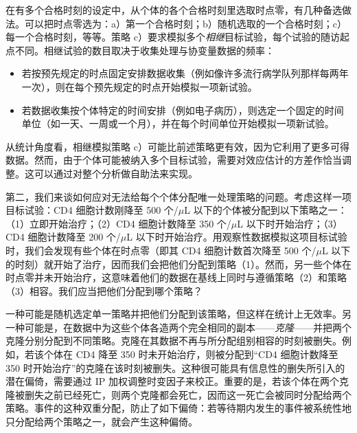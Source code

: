 在有多个合格时刻的设定中，从个体的各个合格时刻里选取时点零，有几种备选做法。可以把时点零选为：a）第一个合格时刻；b）随机选取的一个合格时刻；c）每一个合格时刻，等等。策略 c）要求模拟多个\emph{相继}目标试验，每个试验的随访起点不同。相继试验的数目取决于收集处理与协变量数据的频率：

\begin{itemize}
\item 若按预先规定的时点固定安排数据收集（例如像许多流行病学队列那样每两年一次），则在每个预先规定的时点开始模拟一项新试验。
\item 若数据收集按个体特定的时间安排（例如电子病历），则选定一个固定的时间单位（如一天、一周或一个月），并在每个时间单位开始模拟一项新试验。
\end{itemize}

从统计角度看，相继模拟策略 c）可能比前述策略更有效，因为它利用了更多可得数据。然而，由于个体可能被纳入多个目标试验，需要对效应估计的方差作恰当调整。这可以通过对整个分析做自助法来实现。

第二，我们来谈如何应对无法给每个个体分配唯一处理策略的问题。考虑这样一项目标试验：CD4 细胞计数刚降至 500 个/$\mu$L 以下的个体被分配到以下策略之一：（1）立即开始治疗；（2）CD4 细胞计数降至 350 个/$\mu$L 以下时开始治疗；（3）CD4 细胞计数降至 200 个/$\mu$L 以下时开始治疗。用观察性数据模拟这项目标试验时，我们会发现有些个体在时点零（即其 CD4 细胞计数首次降至 500 个/$\mu$L 以下的时刻）就开始了治疗，因而我们会把他们分配到策略（1）。然而，另一些个体在时点零并未开始治疗，这意味着他们的数据在基线上同时与遵循策略（2）和策略（3）相容。我们应当把他们分配到哪个策略？

一种可能是随机选定单一策略并把他们分配到该策略，但这样在统计上无效率。另一种可能是，在数据中为这些个体各造两个完全相同的副本——\emph{克隆}——并把两个克隆分别分配到不同策略。克隆在其数据不再与所分配组别相容的时刻被删失。例如，若该个体在 CD4 降至 350 时未开始治疗，则被分配到“CD4 细胞计数降至 350 时开始治疗”的克隆在该时刻被删失。这种很可能具有信息性的删失所引入的潜在偏倚，需要通过 IP 加权调整时变因子来校正。重要的是，若该个体在两个克隆被删失之前已经死亡，则两个克隆都会死亡，因而这一死亡会被同时分配给两个策略。事件的这种双重分配，防止了如下偏倚：若等待期内发生的事件被系统性地只分配给两个策略之一，就会产生这种偏倚。

